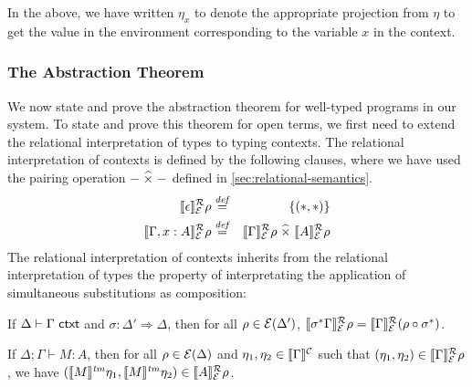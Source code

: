 In the above, we have written $\eta_x$ to denote the appropriate
projection from $\eta$ to get the value in the environment
corresponding to the variable $x$ in the context.

\subsubsection{The Abstraction Theorem}
\label{sec:abstraction-theorem}

We now state and prove the abstraction theorem for well-typed programs
in our system. To state and prove this theorem for open terms, we
first need to extend the relational interpretation of types to typing
contexts. The relational interpretation of contexts is defined by the
following clauses, where we have used the pairing operation
$-\mathrel{\widehat\times}-$ defined in \autoref{sec:relational-semantics}.
\begin{eqnarray*}
  \llbracket \epsilon \rrbracket^{\mathcal{R}}_{\mathcal{E}}{\rho} & \stackrel{\mathit{def}}= & \{(*,*)\} \\
  \llbracket \Gamma, x : A \rrbracket^{\mathcal{R}}_{\mathcal{E}}{\rho} & \stackrel{\mathit{def}}= & \llbracket \Gamma \rrbracket^{\mathcal{R}}_{\mathcal{E}}{\rho} \mathrel{\widehat\times} \llbracket A \rrbracket^{\mathcal{R}}_{\mathcal{E}}{\rho}
\end{eqnarray*}
The relational interpretation of contexts inherits from the relational
interpretation of types the property of interpretating the application
of simultaneous substitutions as composition:
\begin{lemma}\label{lem:ctxtsubst-rel}
  If $\Delta \vdash \Gamma \textsf{ ctxt}$ and $\sigma : \Delta' \Rightarrow
  \Delta$, then for all $\rho \in \mathcal{E}(\Delta')$,
  $\llbracket \sigma^*\Gamma \rrbracket^{\mathcal{R}}_{\mathcal{E}}{\rho} =
  \llbracket \Gamma \rrbracket^{\mathcal{R}}_{\mathcal{E}}{(\rho \circ \sigma^*)}$.
\end{lemma}

\begin{theorem}[Abstraction]\label{thm:abstraction}
  If $\Delta; \Gamma \vdash M : A$, then for all $\rho \in
  \mathcal{E}(\Delta)$ and $\eta_1, \eta_2 \in \llbracket \Gamma \rrbracket^{\mathcal{C}}$ such
  that $(\eta_1, \eta_2) \in \llbracket \Gamma \rrbracket^{\mathcal{R}}_{\mathcal{E}}{\rho}$, we have
  $(\llbracket M \rrbracket^{\mathit{tm}}\eta_1, \llbracket M \rrbracket^{\mathit{tm}}\eta_2) \in \llbracket A \rrbracket^{\mathcal{R}}_{\mathcal{E}}{\rho}$.
\end{theorem}

